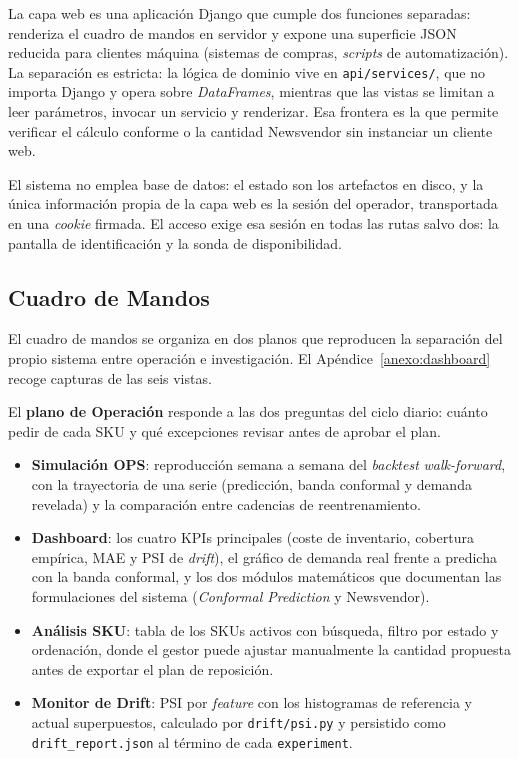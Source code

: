 La capa web es una aplicación Django que cumple dos funciones separadas: renderiza el cuadro de mandos en servidor y expone una superficie JSON reducida para clientes máquina (sistemas de compras, \textit{scripts} de automatización). La separación es estricta: la lógica de dominio vive en \texttt{api/services/}, que no importa Django y opera sobre \textit{DataFrames}, mientras que las vistas se limitan a leer parámetros, invocar un servicio y renderizar. Esa frontera es la que permite verificar el cálculo conforme o la cantidad Newsvendor sin instanciar un cliente web.

El sistema no emplea base de datos: el estado son los artefactos en disco, y la única información propia de la capa web es la sesión del operador, transportada en una \textit{cookie} firmada. El acceso exige esa sesión en todas las rutas salvo dos: la pantalla de identificación y la sonda de disponibilidad.

\subsection{Cuadro de Mandos}

El cuadro de mandos se organiza en dos planos que reproducen la separación del propio sistema entre operación e investigación. El Apéndice~\ref{anexo:dashboard} recoge capturas de las seis vistas.

El \textbf{plano de Operación} responde a las dos preguntas del ciclo diario: cuánto pedir de cada SKU y qué excepciones revisar antes de aprobar el plan.

\begin{itemize}
    \item \textbf{Simulación OPS}: reproducción semana a semana del \textit{backtest} \textit{walk-forward}, con la trayectoria de una serie (predicción, banda conformal y demanda revelada) y la comparación entre cadencias de reentrenamiento.

    \item \textbf{Dashboard}: los cuatro KPIs principales (coste de inventario, cobertura empírica, MAE y PSI de \textit{drift}), el gráfico de demanda real frente a predicha con la banda conformal, y los dos módulos matemáticos que documentan las formulaciones del sistema (\textit{Conformal Prediction} y Newsvendor).

    \item \textbf{Análisis SKU}: tabla de los SKUs activos con búsqueda, filtro por estado y ordenación, donde el gestor puede ajustar manualmente la cantidad propuesta antes de exportar el plan de reposición.

    \item \textbf{Monitor de Drift}: PSI por \textit{feature} con los histogramas de referencia y actual superpuestos, calculado por \texttt{drift/psi.py} y persistido como \texttt{drift\_report.json} al término de cada \texttt{experiment}.
\end{itemize}

